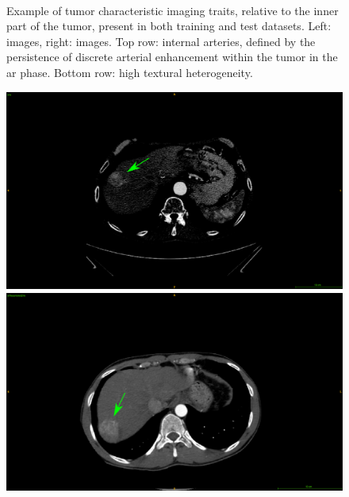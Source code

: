{\begin{figure}[!ht]
\begin{mdframed}[backgroundcolor=blue!50,linecolor=blue!50]
\begin{minipage}{0.45\linewidth}
		\end{minipage} \\
	\end{mdframed}
	\caption{Example of tumor characteristic imaging traits, relative to the inner part of the tumor, present in both training and test datasets. Left: \textbf{} images, right: \textbf{} images. Top row: internal arteries, defined by the persistence of discrete arterial enhancement within the tumor in the \ac{ar} phase. Bottom row: high textural heterogeneity.}
	\label{fig:InterDb_imagingTraits2}
\end{figure}
\begin{figure}[!ht]
	\begin{mdframed}[backgroundcolor=blue!50,linecolor=blue!50]
		\centering
		\begin{minipage}{0.45\linewidth}
			\includegraphics[width=\linewidth]{images/ImagingTraits/ResizeGDB_washin}
		\end{minipage} \hspace{-0.1cm}
		\begin{minipage}{0.45\linewidth}
			\includegraphics[width=\linewidth]{images/ImagingTraits/ResizeTCIA_washin}

\end{minipage}
\end{mdframed}
\end{figure}}
